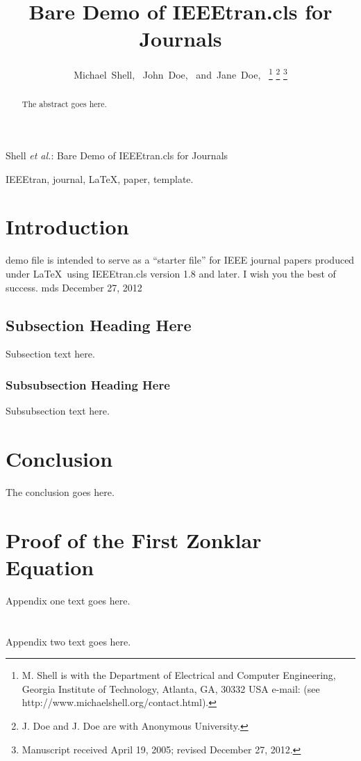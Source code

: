\documentclass[journal]{IEEEtran}
\begin{document}
\title{Bare Demo of IEEEtran.cls for Journals}
\author{Michael~Shell,~
        John~Doe,~
        and~Jane~Doe,~%
\thanks{M. Shell is with the Department
of Electrical and Computer Engineering, Georgia Institute of Technology, Atlanta,
GA, 30332 USA e-mail: (see http://www.michaelshell.org/contact.html).}%
\thanks{J. Doe and J. Doe are with Anonymous University.}%
\thanks{Manuscript received April 19, 2005; revised December 27, 2012.}}
%
{Shell \MakeLowercase{\textit{et al.}}: Bare Demo of IEEEtran.cls for Journals}
\maketitle
\begin{abstract}
The abstract goes here.
\end{abstract}
\begin{IEEEkeywords}
IEEEtran, journal, \LaTeX, paper, template.
\end{IEEEkeywords}
\IEEEpeerreviewmaketitle
\section{Introduction}
 demo file is intended to serve as a ``starter file''
for IEEE journal papers produced under \LaTeX\ using
IEEEtran.cls version 1.8 and later.
I wish you the best of success.
\hfill mds
\hfill December 27, 2012
\subsection{Subsection Heading Here}
Subsection text here.
\subsubsection{Subsubsection Heading Here}
Subsubsection text here.
\section{Conclusion}
The conclusion goes here.
\appendices
\section{Proof of the First Zonklar Equation}
Appendix one text goes here.
\section{}
Appendix two text goes here.
\end{document}

